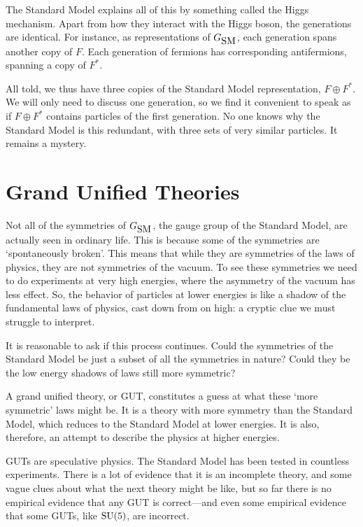 \documentclass[12pt]{article}
\newcommand{\SU}{{\rm SU}}    %
\newcommand{\GSM}{{G_{\mbox{\rm SM}}}}  %
\begin{document}
The Standard Model explains all of this by something called the Higgs
mechanism.  Apart from how they interact with the Higgs boson, the
generations are identical. For instance, as representations of $\GSM$,
each generation spans another copy of $F$.  Each generation of
fermions has corresponding antifermions, spanning a copy of $F^*$.

All told, we thus have three copies of the Standard Model
representation, $F \oplus F^*$.  We will only need to discuss one
generation, so we find it convenient to speak as if $F \oplus F^*$
contains particles of the first generation.  No one knows why the
Standard Model is this redundant, with three sets of very similar
particles.  It remains a mystery.

\section{Grand Unified Theories} \label{sec:guts}

Not all of the symmetries of $\GSM$, the gauge group of the Standard
Model, are actually seen in ordinary life.  This is because some of
the symmetries are `spontaneously broken'.  This means that while they
are symmetries of the laws of physics, they are not symmetries of the
vacuum.  To see these symmetries we need to do experiments at
very high energies, where the asymmetry of the vacuum has less effect.
So, the behavior of particles at lower energies is like a shadow of
the fundamental laws of physics, cast down from on high: a cryptic
clue we must struggle to interpret.

It is reasonable to ask if this process continues.  Could the
symmetries of the Standard Model be just a subset of all the
symmetries in nature? Could they be the low energy shadows of laws
still more symmetric?

A grand unified theory, or GUT, constitutes a guess at what these
`more symmetric' laws might be. It is a theory with more symmetry than
the Standard Model, which reduces to the Standard Model at lower
energies. It is also, therefore, an attempt to describe the physics at
higher energies.

GUTs are speculative physics.  The Standard Model has been tested in
countless experiments.  There is a lot of evidence that it is an
incomplete theory, and some vague clues about what the next theory
might be like, but so far there is no empirical evidence that any GUT
is correct---and even some empirical evidence that some GUTs, like
$\SU(5)$, are incorrect.
\end{document}
